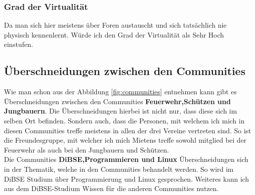 \documentclass[12pt]{article}
\begin{document}
\subsubsection{Grad der Virtualität}
Da man sich hier meistens über Foren austauscht und sich tatsächlich nie physisch kennenlernt. Würde ich den Grad der Virtualität als Sehr Hoch einstufen.
\subsection{Überschneidungen zwischen den Communities}
Wie man schon aus der Abbildung \ref{fig:communities} entnehmen kann gibt es Überschneidungen zwischen den Communities \textbf{Feuerwehr,Schützen und Jungbauern}. Die Überschneidungen hierbei ist nicht nur, dass diese sich im selben Ort befinden. Sondern auch, dass die Personen, mit welchem ich mich in diesen Communities treffe meistens in allen der drei Vereine vertreten sind. So ist die Freundesgruppe, mit welcher ich mich Mietens treffe sowohl mitglied bei der Feuerwehr als auch bei den Jungbauern und Schützen.\\
Die Communities \textbf{DiBSE,Programmieren und Linux} Überschneidungen sich in der Thematik, welche in den Communities behandelt werden. So wird im DiBSE Studium über Programmierung und Linux gesprochen. Weiteres kann ich aus dem DiBSE-Studium Wissen für die anderen Communities nutzen.
\pagebreak
\end{document}
